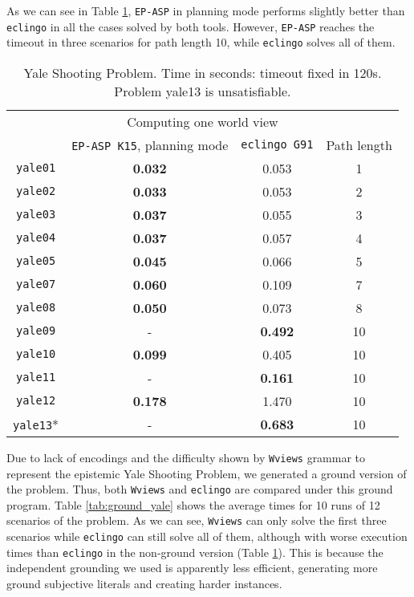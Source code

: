 \documentclass{new_tlp}
\def\eclingo{{\tt eclingo}}
\def\wviews{{\tt Wviews}}
\def\wviews{{\tt Wviews}}
\def\EPASP{{\tt EP-ASP}}
\begin{document}
As we can see in Table \ref{tab:yale}, \EPASP{} in planning mode performs slightly better than \eclingo{} in all the cases solved by both tools. However, \EPASP{} reaches the timeout in three scenarios for path length 10, while \eclingo{} solves all of them.
\begin{table}[ht]
    \begin{tabular}{c|cc|c}
\cline{1-4}
\multicolumn{4}{c}{Computing one world view}         \\ \cline{1-4}
           & \texttt{EP-ASP K15}, planning mode & \texttt{eclingo G91} & Path length \\ \cline{1-4}
\texttt{yale01}  & \textbf{0.032}    & 0.053       & 1           \\
\texttt{yale02}  & \textbf{0.033}    & 0.053       & 2           \\
\texttt{yale03}  & \textbf{0.037}    & 0.055       & 3           \\
\texttt{yale04}  & \textbf{0.037}    & 0.057       & 4           \\
\texttt{yale05}  & \textbf{0.045}    & 0.066       & 5           \\
\texttt{yale07}  & \textbf{0.060}    & 0.109       & 7           \\
\texttt{yale08}  & \textbf{0.050}   & 0.073       & 8           \\
\texttt{yale09}  & -                 & \textbf{0.492}       & 10          \\
\texttt{yale10}  & \textbf{0.099}   & 0.405       & 10          \\
\texttt{yale11}  & -                 & \textbf{0.161}       & 10          \\
\texttt{yale12}  & \textbf{0.178}    & 1.470       & 10          \\
\texttt{yale13}* & -                 & \textbf{0.683}       & 10          \\ \cline{1-4}
\end{tabular}
\setlength{\abovecaptionskip}{5pt}
\caption{Yale Shooting Problem. Time in seconds: timeout fixed in 120s. Problem yale13 is unsatisfiable.}
\label{tab:yale}
\end{table}

Due to lack of encodings and the difficulty shown by \wviews{} grammar to represent the epistemic Yale Shooting Problem, we generated a ground version of the problem. Thus, both \wviews{} and \eclingo{} are compared under this ground program. Table \ref{tab:ground_yale} shows the average times for 10 runs of 12 scenarios of the problem. As we can see, \wviews{} can only solve the first three scenarios while \eclingo{} can still solve all of them, although with worse execution times than \eclingo{} in the non-ground version (Table \ref{tab:yale}).
This is because the independent grounding we used is apparently less efficient, generating more ground subjective literals and creating harder instances.
\end{document}
